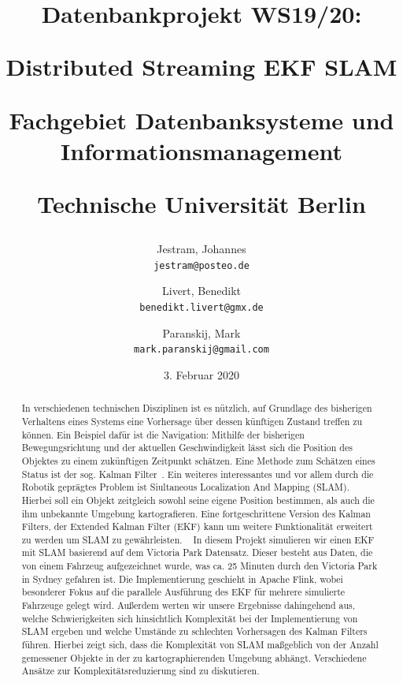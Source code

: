 \documentclass[11pt]{article}
\author{
  	Jestram, Johannes\\
  	\texttt{jestram@posteo.de}
	\and
	Livert, Benedikt\\
	\texttt{benedikt.livert@gmx.de}
	\and
	Paranskij, Mark\\
	\texttt{mark.paranskij@gmail.com}
}
\title{Datenbankprojekt WS19/20: \par Distributed Streaming EKF SLAM \medskip \par 
Fachgebiet Datenbanksysteme und Informationsmanagement \medskip \par Technische Universität Berlin}
\date{3. Februar 2020}
\begin{document}
\maketitle
\newpage

\tableofcontents
\newpage
\begin{abstract}
    In verschiedenen technischen Disziplinen ist es nützlich, auf Grundlage des bisherigen Verhaltens eines Systems eine Vorhersage über dessen künftigen Zustand treffen zu können. Ein Beispiel dafür ist die Navigation: Mithilfe der bisherigen Bewegungsrichtung und der aktuellen Geschwindigkeit lässt sich die Position des Objektes zu einem zukünftigen Zeitpunkt schätzen. Eine Methode zum Schätzen eines
    Status ist der sog. Kalman Filter~\cite{kalman1960new}. 
Ein weiteres interessantes und vor allem durch die Robotik geprägtes Problem ist Siultaneous Localization And Mapping (SLAM). Hierbei soll ein Objekt zeitgleich sowohl seine eigene Position bestimmen, als auch die ihm unbekannte Umgebung kartografieren. Eine fortgeschrittene Version des Kalman Filters, der Extended Kalman Filter (EKF) kann um weitere Funktionalität erweitert zu werden um SLAM zu gewährleisten. ~\cite{freiburg_SLAM}
In diesem Projekt simulieren wir einen EKF mit SLAM basierend auf dem Victoria Park Datensatz. Dieser besteht aus Daten, die von einem Fahrzeug aufgezeichnet wurde, was ca. 25 Minuten durch den Victoria Park in Sydney gefahren ist. Die Implementierung geschieht in Apache Flink, wobei besonderer Fokus auf die parallele Ausführung des EKF für mehrere simulierte Fahrzeuge gelegt wird. Außerdem werten wir unsere Ergebnisse dahingehend aus, welche Schwierigkeiten sich hinsichtlich Komplexität bei der Implementierung von SLAM ergeben und welche Umstände zu schlechten Vorhersagen des Kalman Filters führen. Hierbei zeigt sich, dass die Komplexität von SLAM maßgeblich von der Anzahl gemessener Objekte in der zu kartographierenden Umgebung abhängt. Verschiedene Ansätze zur Komplexitätsreduzierung sind zu diskutieren. 
\end{abstract}
 
\end{document}
